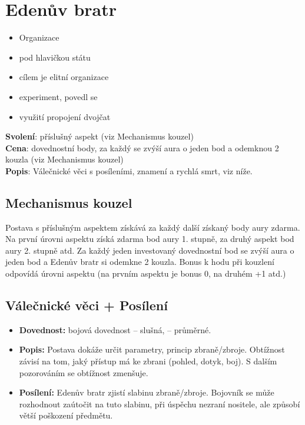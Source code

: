 \documentclass[../main.tex]{subfiles}
\begin{document}
\section{Edenův bratr}
\label{sec:edenuvbratr}

\begin{itemize}
	\item Organizace
	\item pod hlavičkou státu
	\item cílem je elitní organizace
	\item experiment, povedl se
	\item využití propojení dvojčat
\end{itemize}

\begin{povolani}
\textbf{Svolení}: příslušný aspekt (viz Mechanismus kouzel)\\
\textbf{Cena}: dovednostní body, za každý se zvýší aura o jeden bod a odemknou 2 kouzla (viz Mechanismus kouzel)\\
\textbf{Popis}: Válečnické věci s posíleními, znamení a rychlá smrt, viz níže.
\end{povolani}

\subsection{Mechanismus kouzel}
\label{sec:eden-mech-kouzla}

Postava s příslušným aspektem získává za každý další získaný body aury zdarma. Na první úrovni aspektu získá zdarma bod aury 1. stupně, za druhý aspekt bod aury 2. stupně atd. Za každý jeden investovaný dovednostní bod se zvýší aura o jeden bod a Edenův bratr si odemkne 2 kouzla. Bonus k hodu při kouzlení odpovídá úrovni aspektu (na prvním aspektu je bonus 0, na druhém +1 atd.)

\subsection{Válečnické věci + Posílení}
\label{sec:eden-valecnici-posileni}

\begin{specialita}
\begin{itemize}
	\item \textbf{Dovednost:} bojová dovednost – slušná,  – průměrné.
	\item \textbf{Popis:} Postava dokáže určit parametry, princip zbraně/zbroje. Obtížnost závisí na tom, jaký přístup má ke zbrani (pohled, dotyk, boj). S dalším pozorováním se obtížnost zmenšuje.
	\item \textbf{Posílení:} Edenův bratr zjistí slabinu zbraně/zbroje. Bojovník se může rozhodnout zaútočit na tuto slabinu, při úspěchu nezraní nositele, ale způsobí větší poškození předmětu.
\end{itemize}
\end{specialita}
\end{document}
